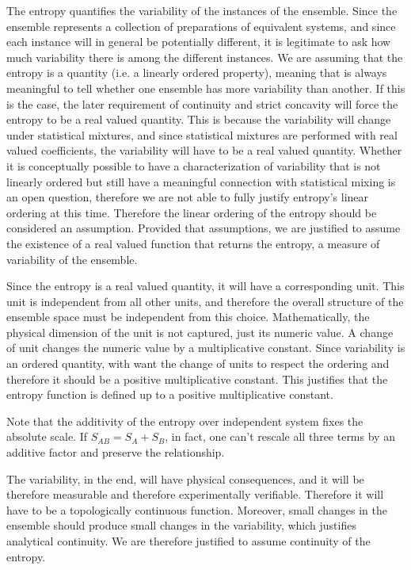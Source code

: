 \begin{justification}
	The entropy quantifies the variability of the instances of the ensemble. Since the ensemble represents a collection of preparations of equivalent systems, and since each instance will in general be potentially different, it is legitimate to ask how much variability there is among the different instances. We are assuming that the entropy is a quantity (i.e. a linearly ordered property), meaning that is always meaningful to tell whether one ensemble has more variability than another. If this is the case, the later requirement of continuity and strict concavity will force the entropy to be a real valued quantity. This is because the variability will change under statistical mixtures, and since statistical mixtures are performed with real valued coefficients, the variability will have to be a real valued quantity. Whether it is conceptually possible to have a characterization of variability that is not linearly ordered but still have a meaningful connection with statistical mixing is an open question, therefore we are not able to fully justify entropy's linear ordering at this time. Therefore the linear ordering of the entropy should be considered an assumption. Provided that assumptions, we are justified to assume the existence of a real valued function that returns the entropy, a measure of variability of the ensemble.
	
	Since the entropy is a real valued quantity, it will have a corresponding unit. This unit is independent from all other units, and therefore the overall structure of the ensemble space must be independent from this choice. Mathematically, the physical dimension of the unit is not captured, just its numeric value. A change of unit changes the numeric value by a multiplicative constant. Since variability is an ordered quantity, with want the change of units to respect the ordering and therefore it should be a positive multiplicative constant. This justifies that the entropy function is defined up to a positive multiplicative constant.
	
	Note that the additivity of the entropy over independent system fixes the absolute scale. If $S_{AB} = S_A + S_B$, in fact, one can't rescale all three terms by an additive factor and preserve the relationship.
	
	The variability, in the end, will have physical consequences, and it will be therefore measurable and therefore experimentally verifiable. Therefore it will have to be a topologically continuous function. Moreover, small changes in the ensemble should produce small changes in the variability, which justifies analytical continuity. We are therefore justified to assume continuity of the entropy.
	

\end{justification}
